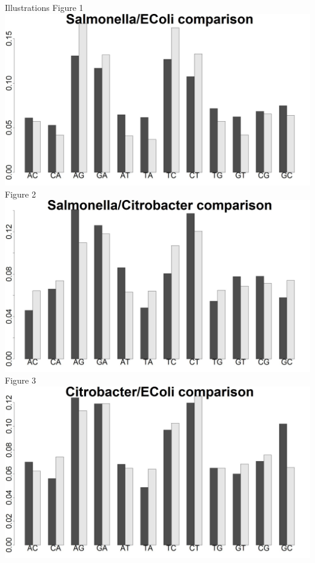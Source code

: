 \documentclass[final]{beamer}
\begin{document}
\begin{frame}{}
\begin{columns}[t]
\begin{column}{.32 \linewidth}

\begin{block}{\large Illustrations}
Figure 1
	\includegraphics[scale = .455]{SalECPercentage.jpeg}
	\newline
Figure 2
 \includegraphics[scale = .455]{CBSalPercentage.jpeg}
 \newline
Figure 3
 \includegraphics[scale = .455]{CBECPercentage.jpeg}



\end{block}
\end{column}
\end{columns}
\end{frame}
\end{document}
